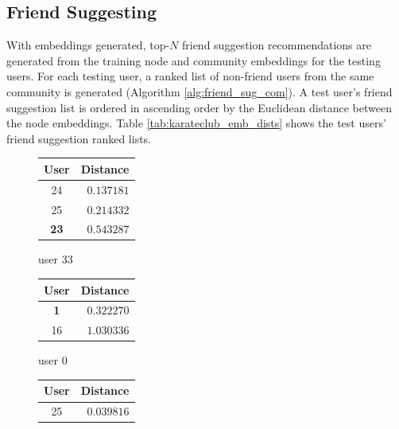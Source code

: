 \documentclass[conference]{IEEEtran}
\begin{document}
\subsection{Friend Suggesting}

With embeddings generated, top-$N$ friend suggestion recommendations are generated from the training node and community embeddings for the testing users. For each testing user, a ranked list of non-friend users from the same community is generated (Algorithm \ref{alg:friend_sug_com}). A test user's friend suggestion list is ordered in ascending order by the Euclidean distance between the node embeddings. Table \ref{tab:karateclub_emb_dists} shows the test users' friend suggestion ranked lists.

\begin{table}
    \centering
    \caption{Testing users' friend suggestions ranked by node embedding distance.}
    \label{tab:karateclub_emb_dists}
    \begin{subfigure}{.4\textwidth}
        \centering
        \begin{tabular}{ c | r }
            User        & Distance   \\
            \hline
            \hline
            24          & $0.137181$ \\
            \hline
            25          & $0.214332$ \\
            \hline
            \textbf{23} & $0.543287$ \\
        \end{tabular}
        \caption{user 33}
    \end{subfigure}
    \begin{subfigure}{.4\textwidth}
        \centering
        \begin{tabular}{ c | r }
            User       & Distance   \\
            \hline
            \hline
            \textbf{1} & $0.322270$ \\
            \hline
            16         & $1.030336$ \\
        \end{tabular}
        \caption{user 0}
    \end{subfigure}
    \begin{subfigure}{.4\textwidth}
        \centering
        \begin{tabular}{ c | r }
            User        & Distance   \\
            \hline
            \hline
            25          & $0.039816$ \\

\end{tabular}
\end{subfigure}
\end{table}
\end{document}
